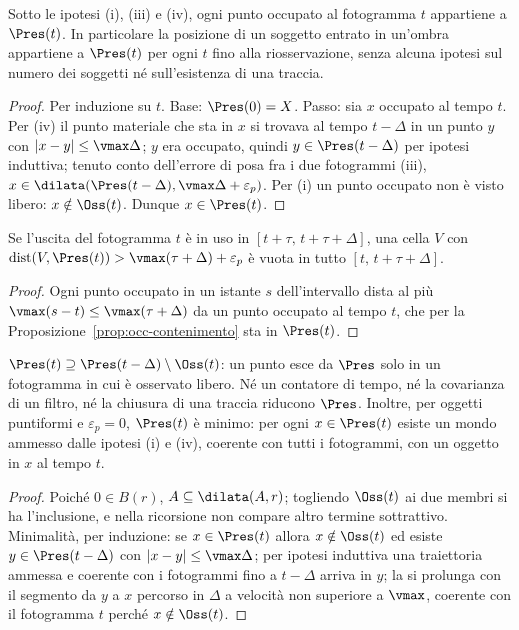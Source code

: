 \begin{proposizione}[Contenimento]\label{prop:occ-contenimento}
Sotto le ipotesi (i), (iii) e (iv), ogni punto occupato al fotogramma $t$ appartiene a $\Pres(t)$. In particolare la posizione di un soggetto entrato in un'ombra appartiene a $\Pres(t)$ per ogni $t$ fino alla riosservazione, senza alcuna ipotesi sul numero dei soggetti né sull'esistenza di una traccia. 
\end{proposizione}
\begin{proof}
Per induzione su $t$. Base: $\Pres(0)=X$. Passo: sia $x$ occupato al tempo $t$. Per (iv) il punto materiale che sta in $x$ si trovava al tempo $t-\Delta$ in un punto $y$ con $|x-y|\le\vmax\Delta$; $y$ era occupato, quindi $y\in\Pres(t-\Delta)$ per ipotesi induttiva; tenuto conto dell'errore di posa fra i due fotogrammi (iii), $x\in\dilata(\Pres(t-\Delta),\vmax\Delta+\varepsilon_p)$. Per (i) un punto occupato non è visto libero: $x\notin\Oss(t)$. Dunque $x\in\Pres(t)$.
\end{proof}

\begin{corollario}\label{cor:occ-libero-adesso}
Se l'uscita del fotogramma $t$ è in uso in $[t+\tau,\,t+\tau+\Delta]$, una cella $V$ con $\operatorname{dist}(V,\Pres(t))>\vmax(\tau+\Delta)+\varepsilon_p$ è vuota in tutto $[t,\,t+\tau+\Delta]$. 
\end{corollario}
\begin{proof}
Ogni punto occupato in un istante $s$ dell'intervallo dista al più $\vmax(s-t)\le\vmax(\tau+\Delta)$ da un punto occupato al tempo $t$, che per la Proposizione~\ref{prop:occ-contenimento} sta in $\Pres(t)$.
\end{proof}

\begin{proposizione}\label{prop:occ-monotonia}
$\Pres(t)\supseteq\Pres(t-\Delta)\setminus\Oss(t)$: un punto esce da $\Pres$ solo in un fotogramma in cui è osservato libero. Né un contatore di tempo, né la covarianza di un filtro, né la chiusura di una traccia riducono $\Pres$. Inoltre, per oggetti puntiformi e $\varepsilon_p=0$, $\Pres(t)$ è minimo: per ogni $x\in\Pres(t)$ esiste un mondo ammesso dalle ipotesi (i) e (iv), coerente con tutti i fotogrammi, con un oggetto in $x$ al tempo $t$. 
\end{proposizione}
\begin{proof}
Poiché $0\in B(r)$, $A\subseteq\dilata(A,r)$; togliendo $\Oss(t)$ ai due membri si ha l'inclusione, e nella ricorsione non compare altro termine sottrattivo. Minimalità, per induzione: se $x\in\Pres(t)$ allora $x\notin\Oss(t)$ ed esiste $y\in\Pres(t-\Delta)$ con $|x-y|\le\vmax\Delta$; per ipotesi induttiva una traiettoria ammessa e coerente con i fotogrammi fino a $t-\Delta$ arriva in $y$; la si prolunga con il segmento da $y$ a $x$ percorso in $\Delta$ a velocità non superiore a $\vmax$, coerente con il fotogramma $t$ perché $x\notin\Oss(t)$.
\end{proof}

